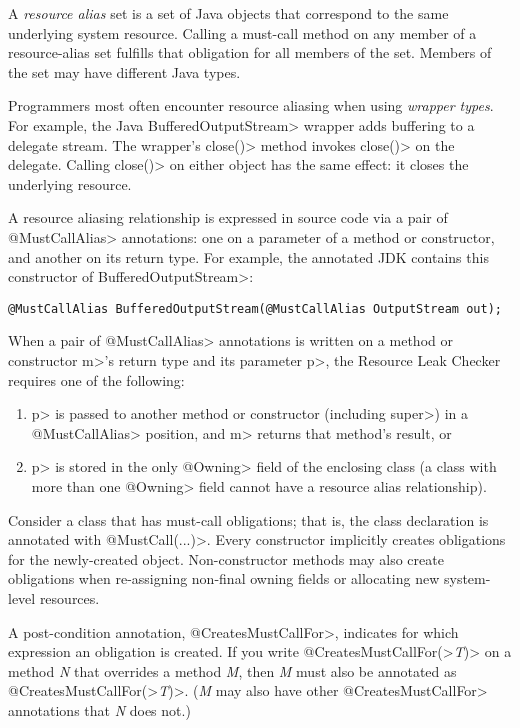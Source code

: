 A \emph{resource alias} set is a set of Java objects that
correspond to the same underlying system resource.
Calling a must-call method on any member of a resource-alias set
fulfills that obligation for all members of the set.
Members of the set may have different Java types.

Programmers most often encounter resource aliasing when using \emph{wrapper types}.
For example, the Java \<Buffered\-Output\-Stream> wrapper adds buffering to a
delegate stream.
The wrapper's \<close()> method invokes \<close()> on the delegate.  Calling
\<close()> on either object has the same effect:  it closes the underlying resource.

A resource aliasing relationship is expressed in source code via a pair of \<@MustCallAlias> annotations:
one on a parameter of a method or constructor, and another on its return type.
For example, the annotated JDK contains this constructor of \<BufferedOutputStream>:
\begin{Verbatim}
@MustCallAlias BufferedOutputStream(@MustCallAlias OutputStream out);
\end{Verbatim}

When a pair of \<@MustCallAlias> annotations is written on a method or constructor \<m>'s return type
and its parameter \<p>, the Resource Leak Checker requires one of the following:
\begin{enumerate}
\item \<p> is passed to another method or constructor (including \<super>) in a
  \<@MustCallAlias> position, and \<m> returns that method's result, or
\item \<p> is stored in the only \<@Owning> field of the enclosing class (a class with more than one
  \<@Owning> field cannot have a resource alias relationship).
\end{enumerate}



Consider a class that has must-call obligations; that is, the class
declaration is annotated with \<@MustCall(...)>.
Every constructor implicitly creates obligations for the newly-created object.
Non-constructor methods may also create obligations
when re-assigning non-final owning fields or allocating
new system-level resources.

A post-condition annotation,
\<@CreatesMustCallFor>,
indicates for which expression an obligation is created.
If you write \<@CreatesMustCallFor(>\emph{T}\<)> on a method \emph{N} that
overrides a method \emph{M}, then \emph{M} must also be annotated as
\<@CreatesMustCallFor(>\emph{T}\<)>.  (\emph{M} may also have other
\<@CreatesMustCallFor> annotations that \emph{N} does not.)

